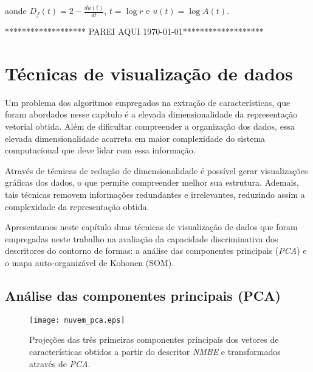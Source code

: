 \noindent aonde  $D_f(t) = 2 - \frac{du(t)}{dt}$, $t = \log{r}$ e $u(t) = \log{A(t)}$.

\color{red} ******************* PAREI AQUI \today ********************\color{black}

\section{Técnicas de visualização de dados}

Um problema dos algoritmos empregados na extração de características, que foram abordados nesse capítulo é a elevada dimensionalidade da representação vetorial obtida. Além de dificultar compreender a organização dos dados, essa elevada dimensionalidade acarreta em maior complexidade do sistema computacional que deve lidar com essa informação. 

Através de técnicas de redução de dimensionalidade é possível gerar visualizações gráficas dos dados, o que permite compreender melhor sua estrutura. Ademais, tais técnicas removem informações redundantes e irrelevantes, reduzindo assim a complexidade da representação obtida.

Apresentamos neste capítulo duas técnicas de visualização de dados que foram empregadas neste trabalho na avaliação da capacidade discriminativa dos descritores do contorno de formas: a análise das componentes principais (\emph{PCA}) e o mapa auto-organizável de Kohonen (SOM).



\subsection{Análise das componentes principais (PCA)}

\begin{figure}[h!]
  \caption{\label{fig:nuvem_pca} Projeções das três primeiras componentes principais dos vetores de características obtidos  a partir do descritor \emph{NMBE} e transformados através de \emph{PCA}.}
  \centering
  \texttt{[image: nuvem\_pca.eps]}
\end{figure}

